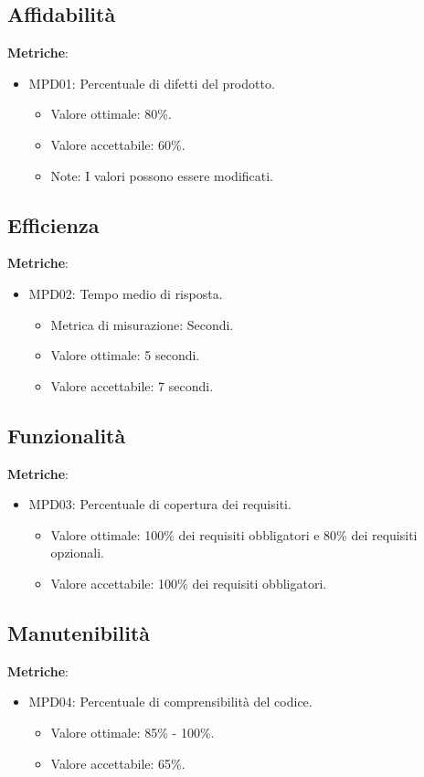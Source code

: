 \documentclass[12pt]{article}
\begin{document}
\subsection{Affidabilità}
\textbf{Metriche}:
\begin{itemize}
	\item MPD01: Percentuale di difetti del prodotto.
	      \begin{itemize}
		      \item Valore ottimale: 80\%.
		      \item Valore accettabile: 60\%.
		      \item Note: I valori possono essere modificati.
	      \end{itemize}
\end{itemize}


\subsection{Efficienza}
\textbf{Metriche}:
\begin{itemize}
	\item MPD02: Tempo medio di risposta.
	      \begin{itemize}
		      \item Metrica di misurazione: Secondi.
		      \item Valore ottimale: 5 secondi.
		      \item Valore accettabile: 7 secondi.
	      \end{itemize}
\end{itemize}

\subsection{Funzionalità}
\textbf{Metriche}:
\begin{itemize}
	\item MPD03: Percentuale di copertura dei requisiti.
	      \begin{itemize}
		      \item Valore ottimale: 100\% dei requisiti obbligatori e 80\% dei requisiti opzionali.
		      \item Valore accettabile: 100\% dei requisiti obbligatori.
	      \end{itemize}
\end{itemize}

\subsection{Manutenibilità}
\textbf{Metriche}:
\begin{itemize}
	\item MPD04: Percentuale di comprensibilità del codice.
	      \begin{itemize}
		      \item Valore ottimale: 85\% - 100\%.
		      \item Valore accettabile: 65\%.
	      \end{itemize}
\end{itemize}
\end{document}
